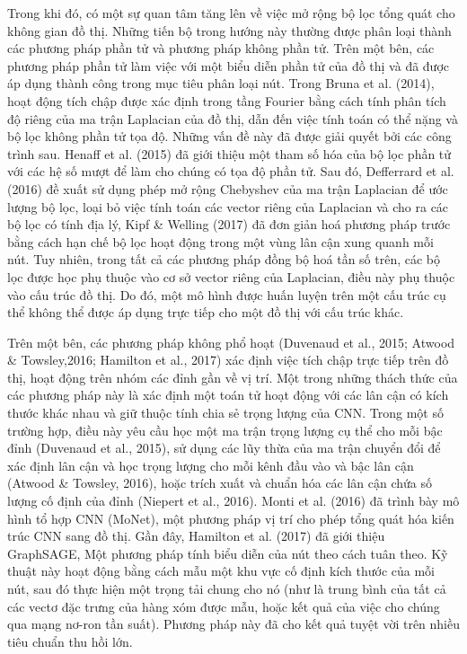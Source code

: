 Trong khi đó, có một sự quan tâm tăng lên về việc mở rộng bộ lọc tổng quát cho không gian đồ thị. Những tiến bộ trong hướng này thường được phân loại thành các phương pháp phần tử và phương pháp không phần tử. Trên một bên, các phương pháp phần tử làm việc với một biểu diễn phần tử của đồ thị và đã được áp dụng thành công trong mục tiêu phân loại nút. Trong Bruna et al. (2014), hoạt động tích chập được xác định trong tầng Fourier bằng cách tính phân tích độ riêng của ma trận Laplacian của đồ thị, dẫn đến việc tính toán có thể nặng và bộ lọc không phần tử tọa độ. Những vấn đề này đã được giải quyết bởi các công trình sau. Henaff et al. (2015) đã giới thiệu một tham số hóa của bộ lọc phần tử với các hệ số mượt để làm cho chúng có tọa độ phần tử. Sau đó, Defferrard et al. (2016) đề xuất sử dụng phép mở rộng Chebyshev của ma trận Laplacian để ước lượng bộ lọc, loại bỏ việc tính toán các vector riêng của Laplacian và cho ra các bộ lọc có tính địa lý, Kipf \& Welling (2017) đã đơn giản hoá phương pháp trước bằng cách hạn chế bộ lọc hoạt động trong một vùng lân cận xung quanh mỗi nút. Tuy nhiên, trong tất cả các phương pháp đồng bộ hoá tần số trên, các bộ lọc được học phụ thuộc vào cơ sở vector riêng của Laplacian, điều này phụ thuộc vào cấu trúc đồ thị. Do đó, một mô hình được huấn luyện trên một cấu trúc cụ thể không thể được áp dụng trực tiếp cho một đồ thị với cấu trúc khác.

Trên một bên, các phương pháp không phổ hoạt (Duvenaud et al., 2015; Atwood \& Towsley,2016; Hamilton et al., 2017) xác định việc tích chập trực tiếp trên đồ thị, hoạt động trên nhóm các đỉnh gần về vị trí. Một trong những thách thức của các phương pháp này là xác định một toán tử hoạt động với các lân cận có kích thước khác nhau và giữ thuộc tính chia sẻ trọng lượng của CNN. Trong một số trường hợp, điều này yêu cầu học một ma trận trọng lượng cụ thể cho mỗi bậc đỉnh (Duvenaud et al., 2015), sử dụng các lũy thừa của ma trận chuyển đổi để xác định lân cận và học trọng lượng cho mỗi kênh đầu vào và bậc lân cận (Atwood \& Towsley, 2016), hoặc trích xuất và chuẩn hóa các lân cận chứa số lượng cố định của đỉnh (Niepert et al., 2016). Monti et al. (2016) đã trình bày mô hình tổ hợp CNN (MoNet), một phương pháp vị trí cho phép tổng quát hóa kiến trúc CNN sang đồ thị. Gần đây, Hamilton et al. (2017) đã giới thiệu GraphSAGE, Một phương pháp tính biểu diễn của nút theo cách tuân theo. Kỹ thuật này hoạt động bằng cách mẫu một khu vực cố định kích thước của mỗi nút, sau đó thực hiện một trọng tải chung cho nó (như là trung bình của tất cả các vectơ đặc trưng của hàng xóm được mẫu, hoặc kết quả của việc cho chúng qua mạng nơ-ron tần suất). Phương pháp này đã cho kết quả tuyệt vời trên nhiều tiêu chuẩn thu hồi lớn.


